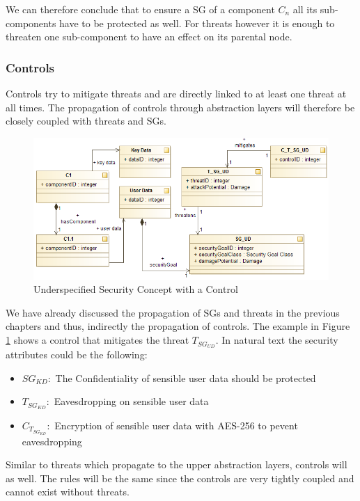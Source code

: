 We can therefore conclude that to ensure a SG of a component $C_n$ all its sub-components have to be protected as well. For threats however it is enough to threaten one sub-component to have an effect on its parental node.

\subsubsection*{Controls}

Controls try to mitigate threats and are directly linked to at least one threat at all times. The propagation of controls through abstraction layers will therefore be closely coupled with threats and SGs.

\begin{figure}[H]
\centering
\includegraphics[width=\textwidth]{pictures/control_propagation.png}
\caption{Underspecified Security Concept with a Control}
\label{fig:control_propagation}
\end{figure} 

We have already discussed the propagation of SGs and threats in the previous chapters and thus, indirectly the propagation of controls. The example in Figure \ref{fig:control_propagation} shows a control that mitigates the threat $T_{SG_{UD}}$. In natural text the security attributes could be the following:

\begin{itemize}
\item[]\textbf{$SG_{KD}:$} The Confidentiality of sensible user data should be protected
\item[]\textbf{$T_{SG_{KD}}:$} Eavesdropping on sensible user data
\item[]\textbf{$C_{T_{SG_{KD}}}:$} Encryption of sensible user data with AES-256 to pevent eavesdropping
\end{itemize}

Similar to threats which propagate to the upper abstraction layers, controls will as well. The rules will be the same since the controls are very tightly coupled and cannot exist without threats.

